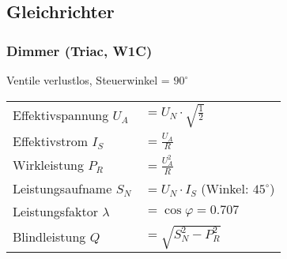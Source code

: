 \subsection{Gleichrichter}
%
%

\begin{multicols}{2}
\subsubsection{Dimmer (Triac, W1C)}
Ventile verlustlos, Steuerwinkel = $90^\circ$ \newline
{}

\renewcommand{\arraystretch}{1.5}
 \begin{tabular}{ll}
 	Effektivspannung $U_A$		& $ = U_N \cdot \sqrt{\frac{1}{2}}$ \\
 	Effektivstrom $I_S$			& $ = \frac{U_A}{R}$ \\
 	Wirkleistung $P_R$			& $ = \frac{U_A^2}{R} $ \\
 	Leistungsaufname $S_N$		& $ = U_N \cdot I_S $ (Winkel: $45^\circ$) \\
 	Leistungsfaktor $\lambda$	& $ = \cos \varphi = 0.707 $\\
 	Blindleistung $Q$			& $ = \sqrt{S_N^2 -P_R^2}$\\
 \end{tabular}
 \end{multicols}
 
